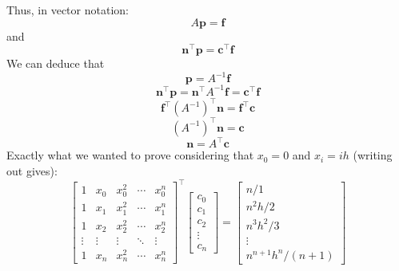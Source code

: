 \documentclass{book}
\begin{document}
Thus, in vector notation:
\begin{equation}
    A \mathbf p = \mathbf f \nonumber
\end{equation}
and
\begin{equation}
    \mathbf n ^\top \mathbf p = \mathbf c^\top \mathbf f \nonumber
\end{equation}
We can deduce that
\begin{equation}
    \mathbf p = A^{-1} \mathbf f \nonumber
\end{equation}
\begin{equation}
    \mathbf n^\top \mathbf p = \mathbf n^\top A^{-1} \mathbf f = \mathbf c^\top \mathbf f \nonumber
\end{equation}
\begin{equation}
    \mathbf f^\top (A^{-1})^\top \mathbf n  = \mathbf f^\top \mathbf c \nonumber
\end{equation}
\begin{equation}
    (A^{-1})^\top \mathbf n  = \mathbf c \nonumber
\end{equation}
\begin{equation}
    \mathbf n  = A^\top \mathbf c \nonumber
\end{equation}
Exactly what we wanted to prove considering that $x_0=0$ and $x_i = ih$ (writing out gives):
\begin{equation}
    \begin{bmatrix}
        1&x_0&x_0^2&\cdots&x_0^n \\
        1&x_1&x_1^2&\cdots&x_1^n \\
        1&x_2&x_2^2&\cdots&x_2^n \\
        \vdots&\vdots & \vdots & \ddots & \vdots\\
        1&x_n&x_n^2&\cdots&x_n^n
    \end{bmatrix}^\top
    \begin{bmatrix}
        c_0 \\
        c_1 \\
        c_2 \\
        \vdots \\
        c_n
    \end{bmatrix}
    =
    \begin{bmatrix}
        n/1\\
        n^2h/2\\
        n^3h^2/3\\
        \vdots \\
        n^{n+1}h^n/(n+1)
    \end{bmatrix} \nonumber
\end{equation}
\end{document}
